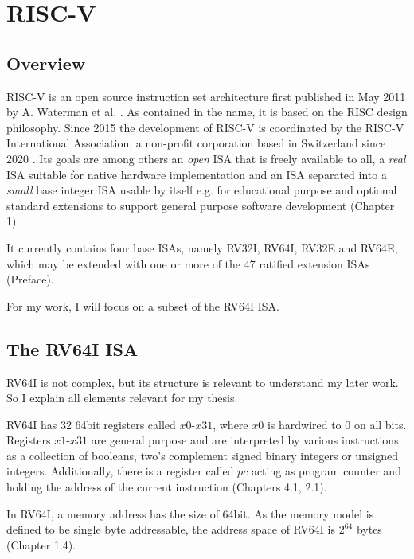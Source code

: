 \chapter{RISC-V}\label{chap:riscv}

\section{Overview}

RISC-V is an open source instruction set architecture first published in May
2011 by A. Waterman et al. \cite{first_riscv}. As contained in the name, it is
based on the RISC design philosophy.  Since
2015 the development of RISC-V is coordinated by the RISC-V International
Association, a non-profit corporation based in Switzerland since 2020
\cite{riscvorg}. Its goals are among others an \emph{open} ISA that is freely
available to all, a \emph{real} ISA suitable for native hardware implementation
and an ISA separated into a \emph{small} base integer ISA usable by itself e.g.
for educational purpose and optional standard extensions to support general
purpose software development \cite{riscv-isa}(Chapter 1).

It currently contains four base ISAs, namely RV32I, RV64I, RV32E and RV64E,
which may be extended with one or more of the 47 ratified extension ISAs
\cite{riscv-isa} (Preface).

 

For my work, I will focus on a subset of the RV64I ISA.

\section{The RV64I ISA}
RV64I is not complex, but its structure is relevant to understand my later
work. So I explain all elements relevant for my thesis.

RV64I has 32 64bit registers called $x0$-$x31$, where $x0$ is hardwired to 0 on
all bits. Registers $x1$-$x31$ are general purpose and are interpreted by
various instructions as a collection of booleans, two's complement signed
binary integers or unsigned integers. Additionally, there is a register called
$pc$ acting as program counter and holding the address of the current
instruction \cite{riscv-isa}(Chapters 4.1, 2.1).

In RV64I, a memory address has the size of 64bit. As the memory model is
defined to be single byte addressable, the address space of RV64I is $2^{64}$
bytes \cite{riscv-isa}(Chapter 1.4).

